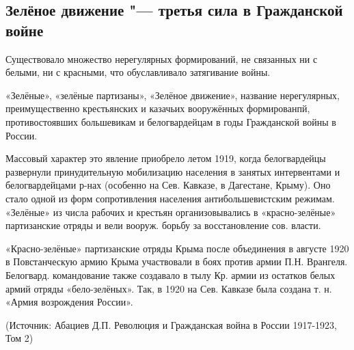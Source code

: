 \subsection{Зелёное движение "--- третья сила в Гражданской войне}

Существовало множество нерегулярных формирований, не связанных ни с белыми, ни с красными, что обуславливало затягивание войны.

«Зелёные», «зелёные партизаны», «Зелёное движение», название нерегулярных, преимущественно крестьянских и казачьих вооружённых формированпй, противостоявших большевикам и белогвардейцам в годы Гражданской войны в России.

Массовый характер это явление приобрело летом 1919, когда белогвардейцы развернули принудительную мобилизацию населения в занятых интервентами и белогвардейцами р-нах (особенно на Сев. Кавказе, в Дагестане, Крыму).
Оно стало одной из форм сопротивления населения антибольшевистским режимам.
«Зелёные» из числа рабочих и крестьян организовывались в «красно-зелёные» партизанские отряды и вели вооруж. борьбу за восстановление сов. власти.

«Красно-зелёные» партизанские отряды Крыма после объединения в августе 1920 в Повстанческую армию Крыма участвовали в боях против армии П.Н. Врангеля.
Белогвард. командование также создавало в тылу Кр. армии из остатков белых армий отряды «бело-зелёных». Так, в 1920 на Сев. Кавказе была создана т. н. «Армия возрождения России».

(Источник: Абациев Д.П. Революция и Гражданская война в России 1917-1923, Том 2)
